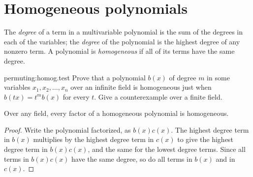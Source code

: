 \section{Homogeneous polynomials}
The \emph{degree} of a term in a multivariable polynomial is the sum of the degrees in each of the variables; the \emph{degree} of the polynomial is the highest degree of any nonzero term.
A polynomial is \emph{homogeneous} if all of its terms have the same degree.
\begin{problem}{permuting:homog.test}
Prove that a polynomial \(b(x)\) of degree \(m\) in some variables \(x_1,x_2,\dots,x_n\) over an infinite field is homogeneous just when \(b(tx)=t^mb(x)\) for every \(t\).
Give a counterexample over a finite field.
\end{problem}
\begin{lemma}
Over any field, every factor of a homogeneous polynomial is homogeneous.
\end{lemma}
\begin{proof}
Write the polynomial factorized, as
\(
b(x)c(x)
\).
The highest degree term in \(b(x)\) multiplies by the highest degree term in \(c(x)\) to give the highest degree term in \(b(x)c(x)\), and the same for the lowest degree terms.
Since all terms in \(b(x)c(x)\) have the same degree, so do all terms in \(b(x)\) and in \(c(x)\).
\end{proof}


